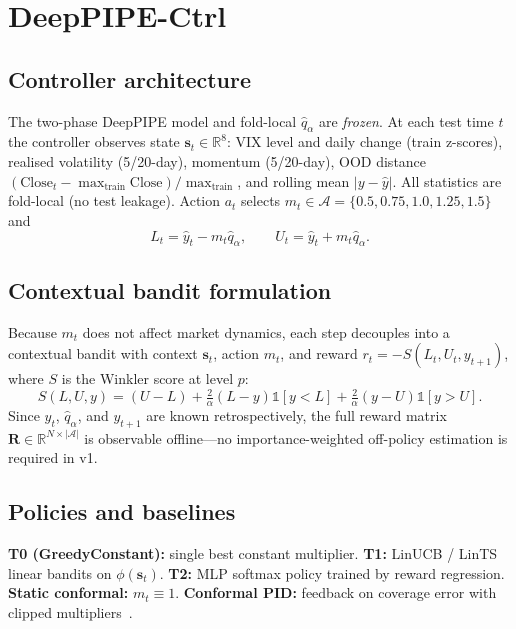 \documentclass[conference]{IEEEtran}
\newcommand{\qhat}{\hat{q}_{\alpha}}
\begin{document}
\section{DeepPIPE-Ctrl}
\label{sec:ctrl}
\subsection{Controller architecture}
The two-phase DeepPIPE model and fold-local $\qhat$ are \emph{frozen}. At each test time $t$ the
controller observes state $\mathbf{s}_t\in\mathbb{R}^8$: VIX level and daily change (train
z-scores), realised volatility (5/20-day), momentum (5/20-day), OOD distance
$(\mathrm{Close}_t-\max_{\mathrm{train}}\mathrm{Close})/\max_{\mathrm{train}}$, and rolling mean
$|y-\hat{y}|$. All statistics are fold-local (no test leakage). Action $a_t$ selects
$m_t\in\mathcal{A}=\{0.5,0.75,1.0,1.25,1.5\}$ and
\begin{equation}
  L_t=\hat{y}_t-m_t\qhat,\qquad U_t=\hat{y}_t+m_t\qhat.
\end{equation}

\subsection{Contextual bandit formulation}
Because $m_t$ does not affect market dynamics, each step decouples into a contextual bandit with
context $\mathbf{s}_t$, action $m_t$, and reward $r_t=-S(L_t,U_t,y_{t+1})$, where $S$ is the
Winkler score at level $p$:
\begin{equation}
  S(L,U,y)=(U-L)+\tfrac{2}{\alpha}(L-y)\mathbb{1}[y<L]+\tfrac{2}{\alpha}(y-U)\mathbb{1}[y>U].
\end{equation}
Since $\hat{y}_t$, $\qhat$, and $y_{t+1}$ are known retrospectively, the full reward matrix
$\mathbf{R}\in\mathbb{R}^{N\times|\mathcal{A}|}$ is observable offline---no importance-weighted
off-policy estimation is required in v1.

\subsection{Policies and baselines}
\textbf{T0 (GreedyConstant):} single best constant multiplier.
\textbf{T1:} LinUCB / LinTS linear bandits on $\phi(\mathbf{s}_t)$.
\textbf{T2:} MLP softmax policy trained by reward regression.
\textbf{Static conformal:} $m_t\equiv1$.
\textbf{Conformal PID:} feedback on coverage error with clipped multipliers~\cite{angelopoulos2023pid}.
\end{document}

